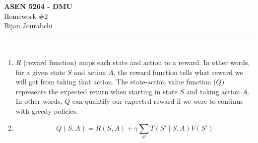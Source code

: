 \documentclass[11pt]{article}
\newcommand{\course}{ASEN 5264 - DMU}
\newcommand{\assignment}{Homework \#2}
\newcommand{\studentname}{Bijan Jourabchi}
\begin{document}
\begin{center}
    {\LARGE \textbf{\course}} \\[6pt]
    {\Large \assignment} \\[10pt]
    \studentname \\
\end{center}

\vspace{1em}
\hrule
\vspace{1em}

\section{}

\begin{enumerate}[label=\alph*)]
    \item 
    $R$ (reward function) maps each state and action to a reward. In other words, for a given state $S$
    and action $A$, the reward function tells what reward we will get from taking that action. The state-action value
    function ($Q$) represents the expected return when starting in state $S$ and taking action $A$. In other words, $Q$
    can quantify our expected reward if we were to continue with greedy policies.
    \item
    \[Q(S,A) = R(S,A) + \gamma \sum_{S'} T(S' \mid S,A ) V(S')\]
\end{enumerate}

\section{}
\end{document}
